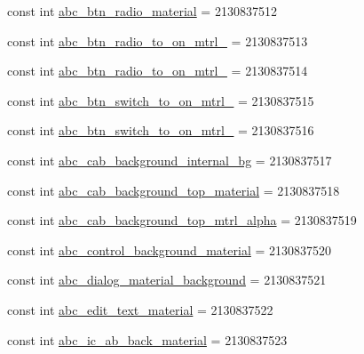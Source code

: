 \begin{DoxyCompactItemize}
const int \mbox{\hyperlink{class_f_w_p_s___app_1_1_droid_1_1_resource_1_1_drawable_ae1766ea0d0b334ada1c5d3d3f1366b02}{abc\+\_\+btn\+\_\+radio\+\_\+material}} = 2130837512
\item 
const int \mbox{\hyperlink{class_f_w_p_s___app_1_1_droid_1_1_resource_1_1_drawable_a70974829e83b61d20638e54154b1ceb8}{abc\+\_\+btn\+\_\+radio\+\_\+to\+\_\+on\+\_\+mtrl\+\_}} = 2130837513
\item 
const int \mbox{\hyperlink{class_f_w_p_s___app_1_1_droid_1_1_resource_1_1_drawable_a4cac8bb83ddf5c10a589879a7e41dc1e}{abc\+\_\+btn\+\_\+radio\+\_\+to\+\_\+on\+\_\+mtrl\+\_}} = 2130837514
\item 
const int \mbox{\hyperlink{class_f_w_p_s___app_1_1_droid_1_1_resource_1_1_drawable_a0e0b992b7f708aca015169e4c851d50f}{abc\+\_\+btn\+\_\+switch\+\_\+to\+\_\+on\+\_\+mtrl\+\_}} = 2130837515
\item 
const int \mbox{\hyperlink{class_f_w_p_s___app_1_1_droid_1_1_resource_1_1_drawable_aba502284dcd9932048393899575a34a4}{abc\+\_\+btn\+\_\+switch\+\_\+to\+\_\+on\+\_\+mtrl\+\_}} = 2130837516
\item 
const int \mbox{\hyperlink{class_f_w_p_s___app_1_1_droid_1_1_resource_1_1_drawable_ac0710444881dccd762a9dd3d01855809}{abc\+\_\+cab\+\_\+background\+\_\+internal\+\_\+bg}} = 2130837517
\item 
const int \mbox{\hyperlink{class_f_w_p_s___app_1_1_droid_1_1_resource_1_1_drawable_ac49634b8aeea5c66726b777eaf7e25a0}{abc\+\_\+cab\+\_\+background\+\_\+top\+\_\+material}} = 2130837518
\item 
const int \mbox{\hyperlink{class_f_w_p_s___app_1_1_droid_1_1_resource_1_1_drawable_a8deb26ee6983869ac343e3bb3a439676}{abc\+\_\+cab\+\_\+background\+\_\+top\+\_\+mtrl\+\_\+alpha}} = 2130837519
\item 
const int \mbox{\hyperlink{class_f_w_p_s___app_1_1_droid_1_1_resource_1_1_drawable_a5a3f54640d125086b0726436ba29be9d}{abc\+\_\+control\+\_\+background\+\_\+material}} = 2130837520
\item 
const int \mbox{\hyperlink{class_f_w_p_s___app_1_1_droid_1_1_resource_1_1_drawable_a854469bdf81e24a23e44621ee53d1596}{abc\+\_\+dialog\+\_\+material\+\_\+background}} = 2130837521
\item 
const int \mbox{\hyperlink{class_f_w_p_s___app_1_1_droid_1_1_resource_1_1_drawable_a91628adca2cb1767431925cf468c3f3d}{abc\+\_\+edit\+\_\+text\+\_\+material}} = 2130837522
\item 
const int \mbox{\hyperlink{class_f_w_p_s___app_1_1_droid_1_1_resource_1_1_drawable_a4eb2fa6543c8fef4c5603cd554e3ddf3}{abc\+\_\+ic\+\_\+ab\+\_\+back\+\_\+material}} = 2130837523

\end{DoxyCompactItemize}
